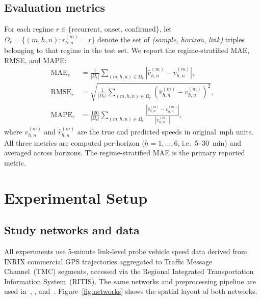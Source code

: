 \documentclass[a4paper]{cas-sc}
\begin{document}
\subsection{Evaluation metrics}

For each regime $r \in \{\text{recurrent, onset, confirmed}\}$,
let $\Omega_r = \{(m, h, n) : r_{h,n}^{(m)} = r\}$ denote the set of
\textit{(sample, horizon, link)} triples belonging to that regime in the
test set.
We report the regime-stratified MAE, RMSE, and MAPE:
\begin{align}
  \text{MAE}_{r}    &= \frac{1}{|\Omega_r|}
    \sum_{(m,h,n) \in \Omega_r} \left|\hat{v}^{(m)}_{h,n} - v^{(m)}_{h,n}\right|,
    \label{eq:mae} \\
  \text{RMSE}_{r}   &= \sqrt{\frac{1}{|\Omega_r|}
    \sum_{(m,h,n) \in \Omega_r} \left(\hat{v}^{(m)}_{h,n} - v^{(m)}_{h,n}\right)^2},
    \label{eq:rmse} \\
  \text{MAPE}_{r}   &= \frac{100}{|\Omega_r|}
    \sum_{(m,h,n) \in \Omega_r}
    \frac{\left|\hat{v}^{(m)}_{h,n} - v^{(m)}_{h,n}\right|}
         {\left|v^{(m)}_{h,n}\right|},
    \label{eq:mape}
\end{align}
where $v^{(m)}_{h,n}$ and $\hat{v}^{(m)}_{h,n}$ are the true and
predicted speeds in original~mph units.
All three metrics are computed per-horizon ($h = 1,\dots,6$, i.e.\
5--30~min) and averaged across horizons.
The regime-stratified MAE is the primary reported metric.

\section{Experimental Setup}
\label{sec:setup}

\subsection{Study networks and data}
\label{sec:networks}

All experiments use 5-minute link-level probe vehicle speed data
derived from INRIX commercial GPS trajectories aggregated to Traffic
Message Channel~(TMC) segments, accessed via the Regional Integrated
Transportation Information System~(RITIS).
The same networks and preprocessing pipeline are used
in~\citet{bae2026labeling}, \citet{bae2026onset}, and~\citet{bae2026spatial}.
Figure~\ref{fig:networks} shows the spatial layout of both networks.
\end{document}
